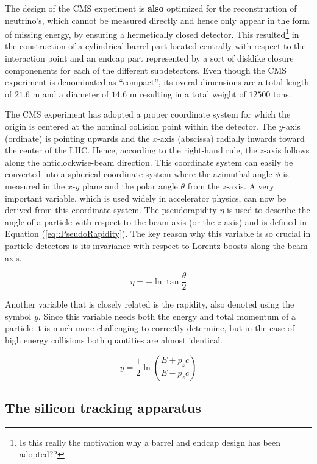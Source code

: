 The design of the CMS experiment is \textbf{also} optimized for the reconstruction of neutrino's, which cannot be measured directly and hence only appear in the form of missing energy, by ensuring a hermetically closed detector. This resulted\footnote{Is this really the motivation why a barrel and endcap design has been adopted??} in the construction of a cylindrical barrel part located centrally with respect to the interaction point and an endcap part represented by a sort of disklike closure componenents for each of the different subdetectors.
Even though the CMS experiment is denominated as ``compact'', its overal dimensions are a total length of $21.6$ m and a diameter of $14.6$ m resulting in a total weight of $12500$ tons.

The CMS experiment has adopted a proper coordinate system for which the origin is centered at the nominal collision point within the detector. The $y$-axis (ordinate) is pointing upwards and the $x$-axis (abscissa) radially inwards toward the center of the LHC. Hence, according to the right-hand rule, the $z$-axis follows along the anticlockwise-beam direction. This coordinate system can easily be converted into a spherical coordinate system where the azimuthal angle $\phi$ is measured in the $x$-$y$ plane and the polar angle $\theta$ from the $z$-axis. 
A very important variable, which is used widely in accelerator physics, can now be derived from this coordinate system. The pseudorapidity $\eta$ is used to describe the angle of a particle with respect to the beam axis (or the $z$-axis) and is defined in Equation (\ref{eq::PseudoRapidity}). The key reason why this variable is so crucial in particle detectors is its invariance with respect to Lorentz boosts along the beam axis.

\begin{equation} \label{eq::PseudoRapidity}
 \eta = - \ln \tan \frac{\theta}{2}
\end{equation}

Another variable that is closely related is the rapidity, also denoted using the symbol $y$. Since this variable needs both the energy and total momentum of a particle it is much more challenging to correctly determine, but in the case of high energy collisions both quantities are almost identical.

\begin{equation}
 y = \frac{1}{2} \ln \left( \frac{E+p_{z}c}{E - p_{z}c} \right)
\end{equation}

\subsection{The silicon tracking apparatus}

